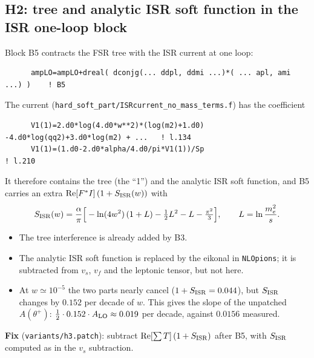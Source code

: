 \documentclass[11pt,a4paper]{article}
\newcommand{\code}[1]{\texttt{#1}}
\newcommand{\Ath}{A(\theta^+)}
\begin{document}
\subsection{H2: tree and analytic ISR soft function in the ISR one-loop block}
\label{sec:h2}
Block B5 contracts the FSR tree with the ISR current at one loop:
\begin{lstlisting}
      ampLO=ampLO+dreal( dconjg(... ddpl, ddmi ...)*( ... apl, ami ...) )    ! B5
\end{lstlisting}
The current (\code{hard\_soft\_part/ISRcurrent\_no\_mass\_terms.f}) has the coefficient
\begin{lstlisting}
      V1(1)=2.d0*log(4.d0*w**2)*(log(m2)+1.d0) -4.d0*log(qq2)+3.d0*log(m2) + ...   ! l.134
      V1(1)=(1.d0-2.d0*alpha/4.d0/pi*V1(1))/Sp                                   ! l.210
\end{lstlisting}
It therefore contains the tree (the ``1'') and the analytic ISR soft function, and B5 carries an
extra ${\rm Re}[F^*I]\,(1+S_{\rm ISR}(w))$ with
\[
S_{\rm ISR}(w)=\frac{\alpha}{\pi}\Big[-\ln(4w^2)\,(1+L)-\tfrac12L^2-L-\tfrac{\pi^2}{3}\Big],
\qquad L=\ln\frac{m_e^2}{s}.
\]
\begin{itemize}
\item The tree interference is already added by B3.
\item The analytic ISR soft function is replaced by the eikonal in
  \code{NLOpions}; it is subtracted from $v_s$, $v_f$ and the leptonic tensor, but not here.
\item At $w\simeq10^{-5}$ the two parts nearly cancel ($1+S_{\rm ISR}=0.044$), but
  $S_{\rm ISR}$ changes by $0.152$ per decade of $w$. This gives the slope of the unpatched $\Ath$:
  $\tfrac12\cdot0.152\cdot A_{\rm LO}\approx0.019$ per decade, against $0.0156$ measured.
\end{itemize}
\textbf{Fix} (\code{variants/h3.patch}): subtract ${\rm Re}[\sum T]\,(1+S_{\rm ISR})$ after B5, with
$S_{\rm ISR}$ computed as in the $v_s$ subtraction.
\end{document}
